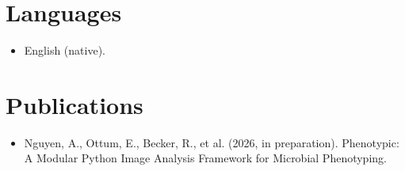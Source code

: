\documentclass[11pt,a4paper,sans]{moderncv}
\begin{document}

\section{Languages}
\vspace{1pt}
\begin{itemize}
\item English (native).
\end{itemize}


\section{Publications}
\vspace{1pt}
\begin{itemize}
\item Nguyen, A., Ottum, E., Becker, R., et al. (2026, in preparation). Phenotypic: A Modular Python Image Analysis Framework for Microbial Phenotyping.
\end{itemize}
\end{document}
